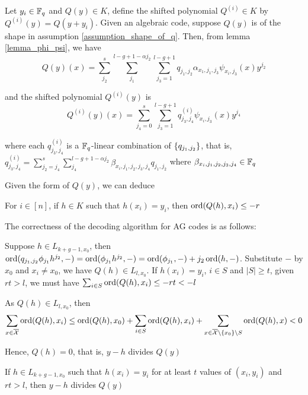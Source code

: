 \documentclass{article}
\begin{document}
\begin{lemma}
    Let $y_i \in \mathbb{F}_q$ and $Q(y) \in K$, define the shifted polynomial $Q^{(i)} \in K$ by $Q^{(i)}(y) = Q(y + y_i)$. Given an algebraic code, suppose $Q(y)$ is of the shape in assumption \ref{assumption_shape_of_q}. Then, from lemma \ref{lemma_phi_psi}, we have
    $$
        Q(y)(x) = \sum_{j_2}^s \sum_{j_1}^{l-g+1 - \alpha j_2} \sum_{j_3=1}^{l - g + 1} q_{j_1, j_2} \alpha_{x_1, j_1, j_3} \psi_{x_i, j_3}(x) y^{j_2}
    $$

    and the shifted polynomial $Q^{(i)}(y)$ is
    $$
        Q^{(i)}(y)(x) = \sum_{j_4=0}^s \sum_{j_3=1}^{l - g + 1} q^{(i)}_{j_3, j_4} \psi_{x_i, j_3}(x) y^{j_4}
    $$

    where each $q^{(i)}_{j_3, j_4}$ is a $\mathbb{F}_q$-linear combination of $\{q_{j_1, j_2}\}$, that is, 
    $
        q^{(i)}_{j_3, j_4} = \sum_{j_2=j_4}^s \sum_{j_4}^{l-g+1-\alpha j_2} \beta_{x_i, j_1, j_2, j_3, j_4} q_{j_1, j_2}
    $ where $\beta_{x_i, j_1, j_2, j_3, j_4} \in \mathbb{F}_q$
\end{lemma}

Given the form of $Q(y)$, we can deduce

\begin{lemma}
    For $i \in [n]$, if $h \in K$ such that $h(x_i) = y_i$, then $\operatorname{ord}(Q(h), x_i) \leq -r$
\end{lemma}

The correctness of the decoding algorithm for AG codes is as follows:

Suppose $h \in L_{k+g-1, x_0}$, then $\operatorname{ord}(q_{j_1, j_2} \phi_{j_1} h^{j_2}, -) = \operatorname{ord}(\phi_{j_1} h^{j_2}, -) = \operatorname{ord}(\phi_{j_1}, -) + j_2 \operatorname{ord}(h, -)$. Substitute $-$ by $x_0$ and $x_i \neq x_0$, we have $Q(h) \in L_{l, x_0}$. If $h(x_i) = y_i$, $i \in S$ and $|S| \geq t$, given $rt > l$, we must have $
    \sum_{i \in S} \operatorname{ord}(Q(h), x_i) \leq -rt  < -l
$

As $Q(h) \in L_{l, x_0}$, then
$$
    \sum_{x \in \overline{\mathcal{X}}} \operatorname{ord}(Q(h), x_i) \leq \operatorname{ord}(Q(h), x_0) + \sum_{i \in S} \operatorname{ord}(Q(h), x_i) + \sum_{x \in \overline{\mathcal{X}} \setminus \{x_0\} \setminus S} \operatorname{ord}(Q(h), x) < 0
$$

Hence, $Q(h) = 0$, that is, $y - h$ divides $Q(y)$

\begin{lemma}
    \label{lemma_correctness_ag}
    If $h \in L_{k+g-1, x_0}$ such that $h(x_i) = y_i$ for at least $t$ values of $(x_i, y_i)$ and $rt > l$, then $y - h$ divides $Q(y)$
\end{lemma}
\end{document}
